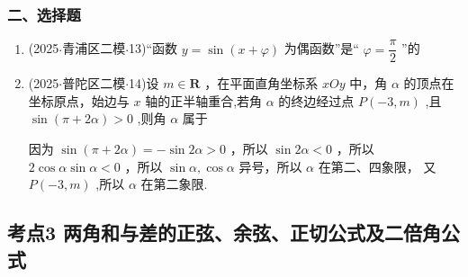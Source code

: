 \subsubsection*{二、选择题}
\begin{enumerate}
    \item (2025$\cdot$青浦区二模$\cdot$13)“函数 $y = \sin \left( {x + \varphi }\right)$ 为偶函数”是“ $\varphi  = \dfrac{\pi }{2}$ ”的 

    \item (2025$\cdot$普陀区二模$\cdot$14)设 $m \in  \mathbf{R}$ ，在平面直角坐标系 ${xOy}$ 中，角 $\alpha$ 的顶点在坐标原点，始边与 $x$ 轴的正半轴重合,若角 $\alpha$ 的终边经过点 $P\left( {-3,m}\right)$ ,且 $\sin \left( {\pi  + {2\alpha }}\right)  > 0$ ,则角 $\alpha$ 属于 
    \begin{jieda}
        因为 $\sin \left( {\pi  + {2\alpha }}\right)  =  - \sin {2\alpha } > 0$ ，所以 $\sin {2\alpha } < 0$ ，所以 $2\cos \alpha \sin \alpha  < 0$ ，所以 $\sin \alpha, \cos \alpha$ 异号，所以 $\alpha$ 在第二、四象限， 又 $P\left( {-3,m}\right)$ ,所以 $\alpha$ 在第二象限.
    \end{jieda}
\end{enumerate}
\subsection*{考点3 两角和与差的正弦、余弦、正切公式及二倍角公式}


